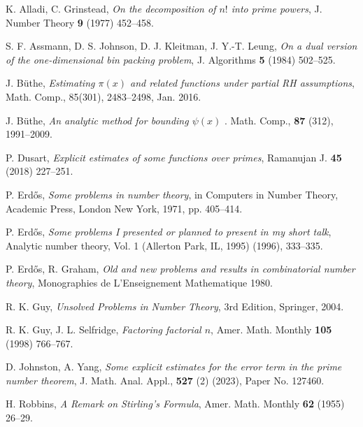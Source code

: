 \documentclass[12pt,a4paper,reqno]{amsart}
\numberwithin{equation}{section}
\theoremstyle{plain}
\theoremstyle{definition}
\begin{document}
\begin{thebibliography}{10}

  
K. Alladi, C. Grinstead, \emph{On the decomposition of $n!$ into prime powers}, J. Number Theory \textbf{9} (1977) 452--458.

S. F. Assmann, D. S. Johnson, D. J. Kleitman, J. Y.-T. Leung, \emph{On a dual version of the one-dimensional bin packing problem}, J. Algorithms \textbf{5} (1984) 502--525.

J. B\"uthe, \emph{Estimating $\pi(x)$ and related functions under partial RH assumptions}, Math. Comp., 85(301), 2483--2498, Jan. 2016.

J. B\"uthe, \emph{An analytic method for bounding $\psi(x)$
}. Math. Comp., \textbf{87} (312), 1991--2009.




P. Dusart, \emph{Explicit estimates of some functions over primes}, Ramanujan J. \textbf{45} (2018) 227--251.

P. Erd\H{o}s, \emph{Some problems in number theory}, in Computers in Number Theory, Academic Press, London New York, 1971, pp. 405--414.

P. Erd\H{o}s, \emph{Some problems I presented or planned to present in my short talk}, Analytic number theory, Vol. 1 (Allerton Park, IL, 1995) (1996), 333--335.

P. Erd\H{o}s, R. Graham, \emph{Old and new problems and results in combinatorial number theory}, Monographies de L'Enseignement Mathematique 1980.

R. K. Guy, \emph{Unsolved Problems in Number Theory}, 3rd Edition, Springer, 2004.

R. K. Guy, J. L. Selfridge, \emph{Factoring factorial $n$}, Amer. Math. Monthly \textbf{105} (1998) 766--767.

D. Johnston, A. Yang, \emph{Some explicit estimates for the error term in the prime number theorem}, J. Math. Anal. Appl., \textbf{527} (2) (2023), Paper No. 127460.

H. Robbins, \emph{A Remark on Stirling's Formula}, Amer. Math. Monthly \textbf{62} (1955) 26--29.


\end{thebibliography}
\end{document}
